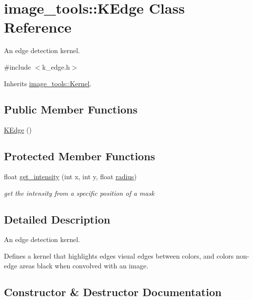 \hypertarget{classimage__tools_1_1KEdge}{}\section{image\+\_\+tools\+:\+:K\+Edge Class Reference}
\label{classimage__tools_1_1KEdge}


An edge detection kernel.  




{\ttfamily \#include $<$k\+\_\+edge.\+h$>$}



Inherits \hyperlink{classimage__tools_1_1Kernel}{image\+\_\+tools\+::\+Kernel}.

\subsection*{Public Member Functions}
\begin{DoxyCompactItemize}
\item 
\hyperlink{classimage__tools_1_1KEdge_a2ebf7825f9afbacb99b803e8709e1787}{K\+Edge} ()
\end{DoxyCompactItemize}
\subsection*{Protected Member Functions}
\begin{DoxyCompactItemize}
\item 
float \hyperlink{classimage__tools_1_1KEdge_ac980938c27aeb2ea927fd7847dd5b020}{get\+\_\+intensity} (int x, int y, float \hyperlink{classimage__tools_1_1Kernel_ac834d16a242dd4a15f5f5e4a6dacea01}{radius})
\begin{DoxyCompactList}\small\item\em get the intensity from a specific position of a mask \end{DoxyCompactList}\end{DoxyCompactItemize}


\subsection{Detailed Description}
An edge detection kernel. 

Defines a kernel that highlights edges visual edges between colors, and colors non-\/edge areas black when convolved with an image. 

\subsection{Constructor \& Destructor Documentation}
